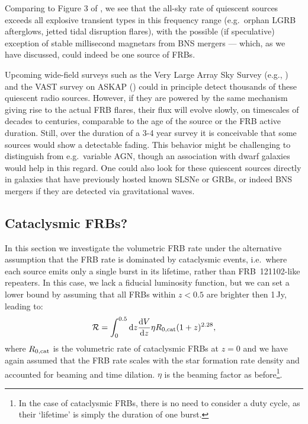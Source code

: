 \documentclass[twocolumn]{aastex6}
\newcommand{\dd}{\ensuremath{\text{d}}}
\newcommand{\repeater}{FRB~121102}
\begin{document}
Comparing to Figure 3 of \citet{Metzger+15b}, we see that the all-sky rate of quiescent sources exceeds all explosive transient types in this frequency range (e.g.~orphan LGRB afterglows, jetted tidal disruption flares), with the possible (if speculative) exception of stable millisecond magnetars from BNS mergers --- which, as we have discussed, could indeed be one source of FRBs.  

Upcoming wide-field surveys such as the Very Large Array Sky Survey (e.g., \citealt{Murphy+15}) and the VAST survey on ASKAP (\citealt{Murphy+13}) could in principle detect thousands of these quiescent radio sources.  However, if they are powered by the same mechanism giving rise to the actual FRB flares, their flux will evolve slowly, on timescales of decades to centuries, comparable to the age of the source or the FRB active duration.  Still, over the duration of a 3-4 year survey it is conceivable that some sources would show a detectable fading.  This behavior might be challenging to distinguish from e.g.~variable AGN, though an association with dwarf galaxies would help in this regard. One could also look for these quiescent sources directly in galaxies that have previously hosted known SLSNe or GRBs, or indeed BNS mergers if they are detected via gravitational waves.


\subsection{Cataclysmic FRBs?}
\label{s:cataclysmic}

In this section we investigate the volumetric FRB rate under the alternative assumption that the FRB rate is dominated by cataclysmic events, i.e.~where each source emits only a single burst in its lifetime, rather than \repeater-like repeaters. In this case, we lack a fiducial luminosity function, but we can set a lower bound by assuming that all FRBs within $z<0.5$ are brighter then 1\,Jy, leading to:
\begin{equation}
\mathcal{R} = \int_0^{0.5} \dd z \frac{\dd V}{\dd z} \eta R_{0{\rm , cat}} (1+z)^{2.28},
\end{equation}
where $R_{0{\rm , cat}}$ is the volumetric rate of cataclysmic FRBs at $z=0$ and we have again assumed that the FRB rate scales with the star formation rate density and accounted for beaming and time dilation. $\eta$ is the beaming factor as before\footnote{In the case of cataclysmic FRBs, there is no need to consider a duty cycle, as their `lifetime' is simply the duration of one burst.}.
\end{document}
